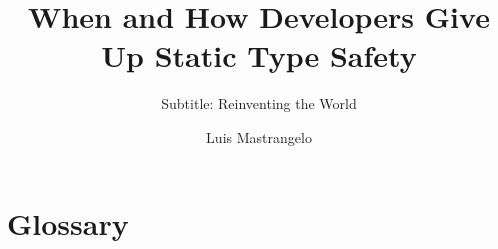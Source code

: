 \documentclass[]{usiinfthesis}
\title{When and How \lang{Java} Developers Give Up Static Type Safety} %
\subtitle{Subtitle: Reinventing the World} %
\author{Luis Mastrangelo} %
\begin{document}
\maketitle %

\frontmatter %



\begin{acknowledgements}
\lipsum 
\end{acknowledgements}

\tableofcontents 
\listoffigures %
\listoftables %

\mainmatter







\appendix %



\backmatter

\chapter{Glossary} %

%
%



\cleardoublepage
\theindex %
\lipsum
\end{document}

